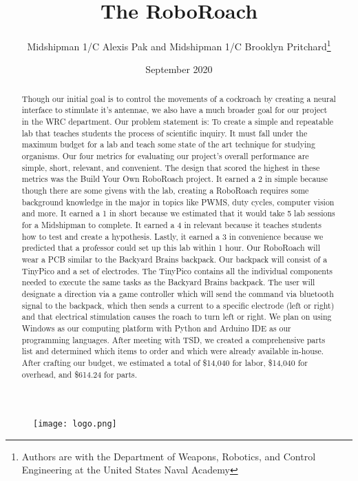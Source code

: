 \documentclass{article}
\title{The RoboRoach}
\author{Midshipman 1/C Alexis Pak and Midshipman 1/C Brooklyn Pritchard\thanks{Authors are with the Department of Weapons, Robotics, and Control Engineering at the United States Naval Academy}}
\begin{document}
\maketitle

\begin{figure}[ht!]
\centering
\texttt{[image: logo.png]}

\label{fig:logo}
\end{figure}



    \date{September 2020}

\tableofcontents

\begin{abstract}
\par Though our initial goal is to control the movements of a cockroach by creating a neural interface to stimulate it’s antennae, we also have a much broader goal for our project in the WRC department. Our problem statement is: To create a simple and repeatable lab that teaches students the process of scientific inquiry. It must fall under the maximum budget for a lab and teach some state of the art technique for studying organisms. Our four metrics for evaluating our project’s overall performance are simple, short, relevant, and convenient. The design that scored the highest in these metrics was the Build Your Own RoboRoach project. It earned a 2 in simple because though there are some givens with the lab, creating a RoboRoach requires some background knowledge in the major in topics like PWMS, duty cycles, computer vision and more. It earned a 1 in short because we estimated that it would take 5 lab sessions for a Midshipman to complete. It earned a 4 in relevant because it teaches students how to test and create a hypothesis. Lastly, it earned a 3 in convenience because we predicted that a professor could set up this lab within 1 hour.  Our RoboRoach will wear a PCB similar to the Backyard Brains backpack. Our backpack will consist of a TinyPico and a set of electrodes. The TinyPico contains all the individual components needed to execute the same tasks as the Backyard Brains backpack. The user will designate a direction via a game controller which will send the command via bluetooth signal to the backpack, which then sends a current to a specific electrode (left or right) and that electrical stimulation causes the roach to turn left or right. We plan on using Windows as our computing platform with Python and Arduino IDE as our programming languages. After meeting with TSD, we created a comprehensive parts list and determined which items to order and which were already available in-house. After crafting our budget, we estimated a total of \$14,040 for labor, \$14,040 for overhead, and \$614.24 for parts. 
\end{abstract}
\end{document}
